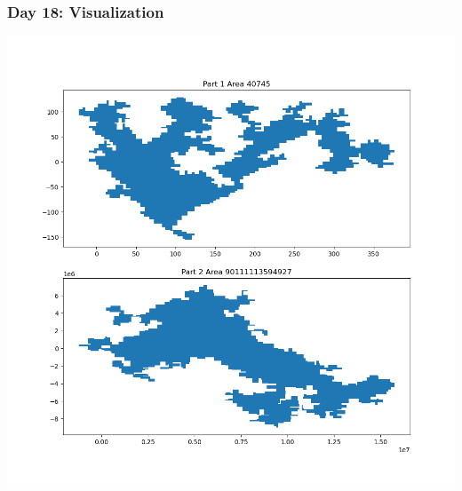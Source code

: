 \begin{frame}
\frametitle{Day 18: Visualization}

\includegraphics[height=\textheight]{Day18}

\end{frame}